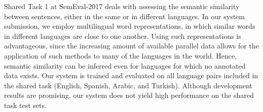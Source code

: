 Shared Task 1 at SemEval-2017 deals with assessing the semantic similarity between sentences, either in the same or in different languages. In our system submission, we employ multilingual word representations, in which similar words in different languages are close to one another. Using such representations is advantageous, since the increasing amount of available parallel data allows for the application of such methods to many of the languages in the world. Hence, semantic similarity can be inferred even for languages for which no annotated data exists. Our system is trained and evaluated on all language pairs included in the shared task (English, Spanish, Arabic, and Turkish). Although development results are promising, our system does not yield high performance on the shared task test sets.
